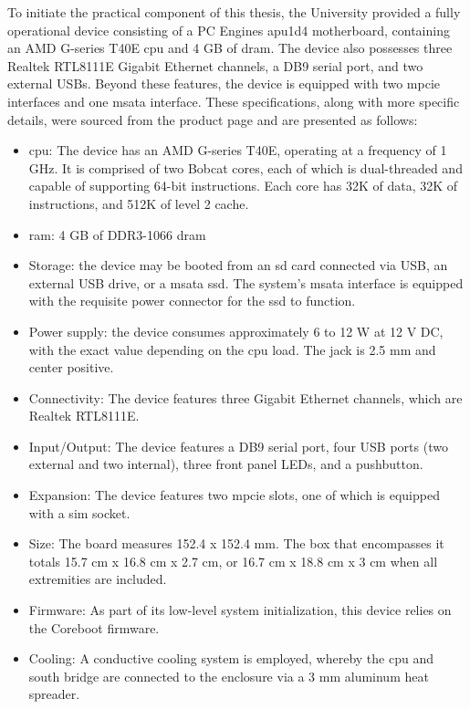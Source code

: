 To initiate the practical component of this thesis, the University provided a fully operational device consisting of a PC Engines apu1d4 motherboard, containing an AMD G-series T40E \gls{cpu} and 4 GB of \gls{dram}. The device also possesses three Realtek RTL8111E Gigabit Ethernet channels, a DB9 serial port, and two external USBs. Beyond these features, the device is equipped with two \gls{mpcie} interfaces and one \gls{msata} interface. 
These specifications, along with more specific details, were sourced from the product page and are presented as follows:

\begin{itemize}
    \item \gls{cpu}: The device has an AMD G-series T40E, operating at a frequency of 1 GHz. It is comprised of two Bobcat cores, each of which is dual-threaded and capable of supporting 64-bit instructions. Each core has 32K of data, 32K of instructions, and 512K of level 2 cache.
    \item \gls{ram}: 4 GB of DDR3-1066 \gls{dram}
    \item Storage: the device may be booted from an \gls{sd} card connected via USB, an external USB drive, or a \gls{msata} \gls{ssd}. The system's \gls{msata} interface is equipped with the requisite power connector for the \gls{ssd} to function.
    \item Power supply: the device consumes approximately 6 to 12 W at 12 V DC, with the exact value depending on the \gls{cpu} load. The jack is 2.5 mm and center positive.
    \item Connectivity: The device features three Gigabit Ethernet channels, which are Realtek RTL8111E.
    \item Input/Output: The device features a DB9 serial port, four USB ports (two external and two internal), three front panel LEDs, and a pushbutton.
    \item Expansion: The device features two \gls{mpcie} slots, one of which is equipped with a \gls{sim} socket. 
    \item Size: The board measures 152.4 x 152.4 mm. The box that encompasses it totals 15.7 cm x 16.8 cm x 2.7 cm, or 16.7 cm x 18.8 cm x 3 cm when all extremities are included.
    \item Firmware: As part of its low-level system initialization, this device relies on the Coreboot firmware.
    \item Cooling: A conductive cooling system is employed, whereby the \gls{cpu} and south bridge are connected to the enclosure via a 3 mm aluminum heat spreader.
\end{itemize}


